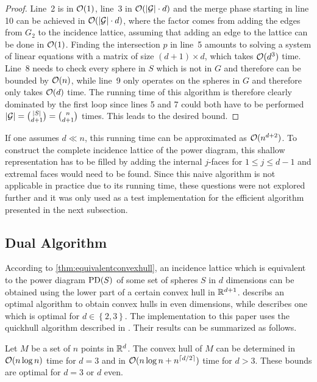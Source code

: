 \begin{proof}
    Line~2 is in $\mathcal{O}(1)$, line~3 in $\mathcal{O}(\left\vert \mathcal{G} \right\vert \cdot d)$ and the merge phase starting in line 10 can be achieved in $\mathcal{O}(\left\vert \mathcal{G} \right\vert \cdot d)$, where the factor comes from adding the edges from $G_2$ to the incidence lattice, assuming that adding an edge to the lattice can be done in $\mathcal{O}(1)$.
    Finding the intersection $p$ in line~5 amounts to solving a system of linear equations with a matrix of size $(d+1) \times d$, which takes $\mathcal{O}(d^3)$ time.
    Line~8 needs to check every sphere in $S$ which is not in $G$ and therefore can be bounded by $\mathcal{O}(n)$, while line~9 only operates on the spheres in $G$ and therefore only takes $\mathcal{O}(d)$ time.
    The running time of this algorithm is therefore clearly dominated by the first loop since lines 5 and 7 could both have to be performed $\left\vert \mathcal{G} \right\vert = \binom{\left\vert S \right\vert}{d + 1} = \binom{n}{d + 1}$ times.
    This leads to the desired bound.
\end{proof}

If one assumes $d \ll n$, this running time can be approximated as $\mathcal{O}(n^{d+2})$.
To construct the complete incidence lattice of the power diagram, this shallow representation has to be filled by adding the internal $j$-faces for $1 \leq j \leq d -1$ and extremal faces would need to be found.
Since this naive algorithm is not applicable in practice due to its running time, these questions were not explored further and it was only used as a test implementation for the efficient algorithm presented in the next subsection.

\subsection{Dual Algorithm}
\label{sub:dual_algorithm}
According to \cref{thm:equivalentconvexhull}, an incidence lattice which is equivalent to the power diagram $\operatorname{PD}(S)$ of some set of spheres $S$ in $d$ dimensions can be obtained using the lower part of a certain convex hull in $\mathbb{R}^{d+1}$.
\cite{seidel1981convex} describs an optimal algorithm to obtain convex hulls in even dimensions, while \cite{preparata1977convex} describes one which is optimal for $d \in \left\{ 2, 3 \right\}$.
The implementation to this paper uses the quickhull algorithm described in \cite{barber1996quickhull}.
Their results can be summarized as follows.
\begin{lemma}
    \label{lem:convexhulls}
    Let $M$ be a set of $n$ points in $\mathbb{R}^d$.
    The convex hull of $M$ can be determined in $\mathcal{O}(n \log n)$ time for $d = 3$ and in $\mathcal{O}(n \log n + n^{\left\lceil d/2\right\rceil})$ time for $d > 3$.
    These bounds are optimal for $d = 3$ or $d$ even.
\end{lemma}

